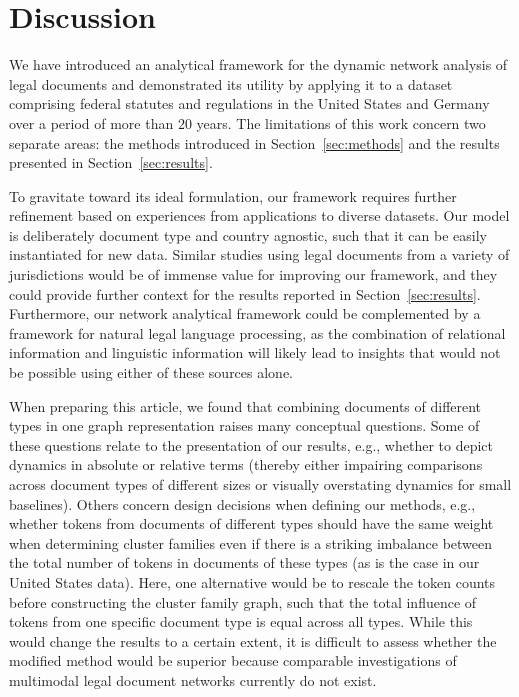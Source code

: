 \section{Discussion}
\label{sec:discussion}

We have introduced an analytical framework for the dynamic network analysis of legal documents and demonstrated its utility by applying it to a dataset comprising federal statutes and regulations in the United States and Germany over a period of more than $20$ years.
The limitations of this work concern two separate areas: 
the methods introduced in Section~\ref{sec:methods} and the results presented in Section~\ref{sec:results}.

To gravitate toward its ideal formulation, our framework requires further refinement based on experiences from applications to diverse datasets.
Our model is deliberately document type and country agnostic, such that it can be easily instantiated for new data. 
Similar studies using legal documents from a variety of jurisdictions would be of immense value for improving our framework, 
and they could provide further context for the results reported in Section~\ref{sec:results}.
Furthermore, our network analytical framework could be complemented by a framework for natural legal language processing, 
as the combination of relational information and linguistic information will likely lead to insights that would not be possible using either of these sources alone.

When preparing this article, we found that combining documents of different types in one graph representation raises many conceptual questions.
Some of these questions relate to the presentation of our results, e.g., 
whether to depict dynamics in absolute or relative terms (thereby either impairing comparisons across document types of different sizes or visually overstating dynamics for small baselines).
Others concern design decisions when defining our methods, 
e.g., whether tokens from documents of different types should have the same weight when determining cluster families even if there is a striking imbalance between the total number of tokens in documents of these types (as is the case in our United States data).
Here, one alternative would be to rescale the token counts before constructing the cluster family graph, 
such that the total influence of tokens from one specific document type is equal across all types.
While this would change the results to a certain extent, 
it is difficult to assess whether the modified method would be superior because comparable investigations of multimodal legal document networks currently do not exist.

